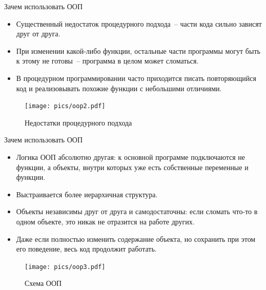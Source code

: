 \documentclass[aspectratio=169, mathserif]{beamer}	%
\begin{document}
\begin{frame}[fragile]{Зачем использовать ООП}
\scriptsize
\begin{itemize}
\item Существенный недостаток процедурного подхода~-- части кода сильно зависят друг от друга.
\end{itemize}
\begin{minipage}{.35\textwidth}
\begin{itemize}
\item При изменении какой-либо функции, остальные части программы могут быть к этому не готовы~-- программа в целом может сломаться.
\item В процедурном программировании часто приходится писать повторяющийся код и реализовывать похожие функции с небольшими отличиями.
\end{itemize}
\vfill
\end{minipage}
\begin{minipage}{.64\textwidth}
\begin{figure}[h!]
\centering
\texttt{[image: pics/oop2.pdf]}
\caption{Недостатки процедурного подхода}
\end{figure}
\end{minipage}
\vfill
\end{frame}


\begin{frame}[fragile]{Зачем использовать ООП}
\scriptsize
\begin{minipage}{.54\textwidth}
\begin{itemize}
\item Логика ООП абсолютно другая: к основной программе подключаются не функции, а объекты, внутри которых уже есть собственные переменные и функции.
\item Выстраивается более иерархичная структура.
\item Объекты независимы друг от друга и самодостаточны: если сломать что-то в одном объекте, это никак не отразится на работе других.
\item Даже если полностью изменить содержание объекта, но сохранить при этом его поведение, весь код продолжит работать.
\end{itemize}
\end{minipage}
\begin{minipage}{.45\textwidth}
\begin{figure}[h!]
\centering
\texttt{[image: pics/oop3.pdf]}
\caption{Схема ООП}
\end{figure}
\end{minipage}
\vfill
\end{frame}
\end{document}
